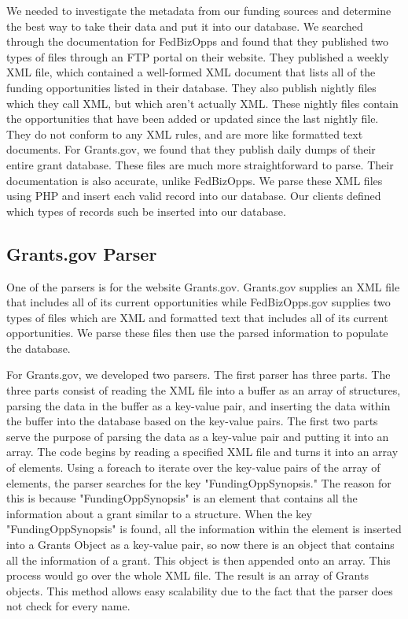 \documentclass[onecolumn]{IEEEtran}
\begin{document}
We needed to investigate the metadata from our funding sources and determine the best way to take their data and put it into our database. We searched through the documentation for FedBizOpps and found that they published two types of files through an FTP portal on their website. They published a weekly XML file, which contained a well-formed XML document that lists all of the funding opportunities listed in their database. They also publish nightly files which they call XML, but which aren't actually XML. These nightly files contain the opportunities that have been added or updated since the last nightly file. They do not conform to any XML rules, and are more like formatted text documents. For Grants.gov, we found that they publish daily dumps of their entire grant database. These files are much more straightforward to parse. Their documentation is also accurate, unlike FedBizOpps. We parse these XML files using PHP and insert each valid record into our database. Our clients defined which types of records such be inserted into our database. 

\subsection{Grants.gov Parser}
One of the parsers is for the website Grants.gov. Grants.gov supplies an XML file that includes all of its current opportunities while FedBizOpps.gov supplies two types of files which are XML and formatted text that includes all of its current opportunities. We parse these files then use the parsed information to populate the database.  

For Grants.gov, we developed two parsers. The first parser has three parts. The three parts consist of reading the XML file into a buffer as an array of structures, parsing the data in the buffer as a key-value pair, and inserting the data within the buffer into the database based on the key-value pairs. The first two parts serve the purpose of parsing the data as a key-value pair and putting it into an array. The code begins by reading a specified XML file and turns it into an array of elements. Using a foreach to iterate over the key-value pairs of the array of elements, the parser searches for the key "FundingOppSynopsis." The reason for this is because "FundingOppSynopsis" is an element that contains all the information about a grant similar to a structure. When the key "FundingOppSynopsis" is found, all the information within the element is inserted into a Grants Object as a key-value pair, so now there is an object that contains all the information of a grant. This object is then appended onto an array. This process would go over the whole XML file. The result is an array of Grants objects. This method allows easy scalability due to the fact that the parser does not check for every name. 
\end{document}
